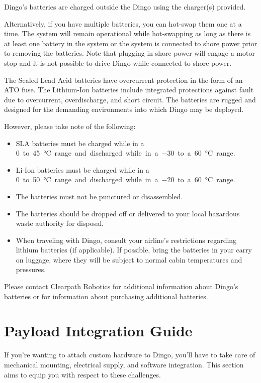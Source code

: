 \documentclass[]{clearpath-latex/clearpath-manual}
\begin{document}
Dingo's batteries are charged outside the Dingo using the charger(s) provided.

Alternatively, if you have multiple batteries, you can hot-swap them one at a time. The system will remain operational while hot-swapping as long as there is at least one battery in the system or the system is connected to shore power prior to removing the batteries. Note that plugging in shore power will engage a motor stop and it is not possible to drive Dingo while connected to shore power.

The Sealed Lead Acid batteries have overcurrent protection in the form of an ATO fuse. The Lithium-Ion batteries include integrated protections against fault due to overcurrent, overdischarge,
and short circuit. The batteries are rugged and designed for the demanding environments into
which Dingo may be deployed.

However, please take note of the following:

\begin{itemize}
\item SLA batteries must be charged while in a \SI{0} to \SI{45}{\celsius} range and discharged while in a \SI{-30} to a \SI{60}{\celsius} range.
\item Li-Ion batteries must be charged while in a \SI{0} to \SI{50}{\celsius} range and discharged while in a \SI{-20} to a \SI{60}{\celsius} range.
\item The batteries must not be punctured or disassembled.
\item The batteries should be dropped off or delivered to your local hazardous waste authority for disposal.
\item When traveling with Dingo, consult your airline's restrictions regarding lithium
	batteries (if applicable). If possible, bring the batteries in your carry on luggage, where they will
be subject to normal cabin temperatures and pressures.
\end{itemize}

Please contact Clearpath Robotics for additional information about Dingo's batteries or
for information about purchasing additional batteries.


\section{Payload Integration Guide}

If you're wanting to attach custom hardware to Dingo, you'll have to take care of
mechanical mounting, electrical supply, and software integration. This section
aims to equip you with respect to these challenges.
\end{document}

